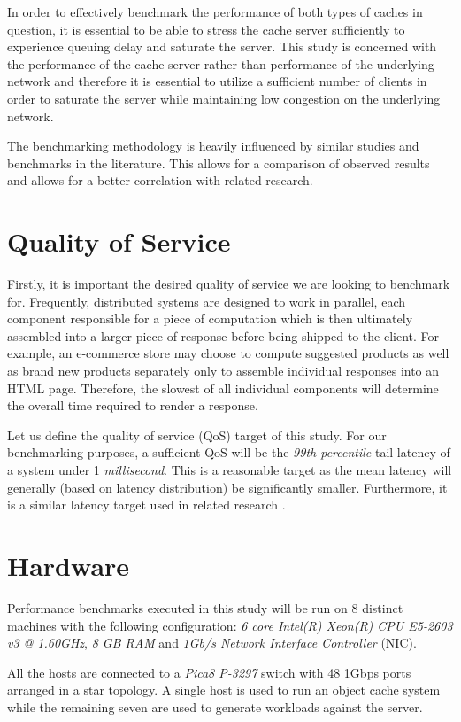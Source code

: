 
In order to effectively benchmark the performance of both types of caches in question, it is essential to be able to stress the cache server sufficiently to experience queuing delay and saturate the server. This study is concerned with the performance of the cache server rather than performance of the underlying network and therefore it is essential to utilize a sufficient number of clients in order to saturate the server while maintaining low congestion on the underlying network.

The benchmarking methodology is heavily influenced by similar studies and benchmarks in the literature. This allows for a comparison of observed results and allows for a better correlation with related research.


\section{Quality of Service}
Firstly, it is important the desired quality of service we are looking to benchmark for. Frequently, distributed systems are designed to work in parallel, each component responsible for a piece of computation which is then ultimately assembled into a larger piece of response before being shipped to the client. For example, an e-commerce store may choose to compute suggested products as well as brand new products separately only to assemble individual responses into an HTML page. Therefore, the slowest of all individual components will determine the overall time required to render a response.

Let us define the quality of service (QoS) target of this study. For our benchmarking purposes, a sufficient QoS will be the \textit{99th percentile} tail latency of a system under 1 \textit{millisecond}. This is a reasonable target as the mean latency will generally (based on latency distribution) be significantly smaller. Furthermore, it is a similar latency target used in related research \cite{leverich2014reconciling}.

\section{Hardware}
Performance benchmarks executed in this study will be run on 8 distinct machines with the following configuration: \textit{6 core Intel(R) Xeon(R) CPU E5-2603 v3 @ 1.60GHz}, \textit{8 GB RAM} and \textit{1Gb/s Network Interface Controller} (NIC).

All the hosts are connected to a \textit{Pica8 P-3297} switch with 48 1Gbps ports arranged in a star topology. A single host is used to run an object cache system while the remaining seven are used to generate workloads against the server.

